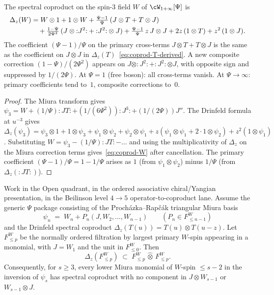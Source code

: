 \begin{proposition}
\label{prop:spin3-miura-coprod}
\ClaimStatusProvedHere
The spectral coproduct on the spin-$3$ field $W$ of
$\cW_{1+\infty}[\Psi]$ is
\begin{align}
\label{eq:coprod-W}
 \Delta_z(W)
 &= W \otimes 1 + 1 \otimes W
 + \tfrac{\Psi - 1}{\Psi}\,
 (J \otimes T + T \otimes J) \\
 &\quad
 + \tfrac{1 - \Psi}{2\Psi^2}\,
 (J \otimes {:}J^2{:}
 + {:}J^2{:} \otimes J)
 + \tfrac{\Psi - 1}{\Psi}\,z\,
 J \otimes J
 + 2z\,(1 \otimes T)
 + z^2\,(1 \otimes J).
 \notag
\end{align}
The coefficient $(\Psi - 1)/\Psi$ on the primary
cross-terms $J \otimes T + T \otimes J$ is the same as
the coefficient on $J \otimes J$ in
$\Delta_z(T)$~\eqref{eq:coprod-T-derived}. A new
composite correction $(1 - \Psi)/(2\Psi^2)$ appears
on $J \otimes {:}J^2{:} + {:}J^2{:} \otimes J$, with
opposite sign and suppressed by $1/(2\Psi)$.
At $\Psi = 1$ \textup{(}free boson\textup{)}: all
cross-terms vanish. At $\Psi \to \infty$: primary
coefficients tend to~$1$, composite corrections to~$0$.
\end{proposition}

\begin{proof}
The Miura transform gives
$\psi_3 = W + (1/\Psi){:}JT{:} + (1/(6\Psi^2)){:}J^3{:}
+ (1/(2\Psi))J''$. The Drinfeld formula at $u^{-3}$
gives $\Delta_z(\psi_3) = \psi_3 \otimes 1 + 1 \otimes
\psi_3 + \psi_1 \otimes \psi_2 + \psi_2 \otimes \psi_1
+ z(\psi_1 \otimes \psi_1 + 2 \cdot 1 \otimes \psi_2)
+ z^2(1 \otimes \psi_1)$. Substituting $W = \psi_3 -
(1/\Psi){:}JT{:} - \ldots$ and using the multiplicativity
of $\Delta_z$ on the Miura correction terms
gives~\eqref{eq:coprod-W} after cancellation.
The primary coefficient $(\Psi - 1)/\Psi = 1 - 1/\Psi$
arises as $1$ (from $\psi_1 \otimes \psi_2$)
minus $1/\Psi$ (from $\Delta_z({:}JT{:})$).
\end{proof}

\begin{lemma}
\label{lem:miura-triangularity-under-Delta}
\ClaimStatusProvedHere
Work in the Open quadrant, in the ordered associative
chiral/Yangian presentation, in the Beilinson level
$4 \to 5$ operator-to-coproduct lane.  Assume the generic
$\Psi$ package consisting of the
Proch\'azka--Rap\v{c}\'ak triangular Miura basis
\[
 \psi_n
 \;=\;
 W_n + P_n(J,W_2,\ldots,W_{n-1})
 \qquad (P_n \in F^{W}_{\leq n-1})
\]
and the Drinfeld spectral coproduct
$\Delta_z(T(u)) = T(u)\otimes T(u-z)$.  Let
$F^{W}_{\leq p}$ be the normally ordered filtration by
largest primary $W$-spin appearing in a monomial, with
$J=W_1$ and the unit in $F^{W}_{\leq0}$.  Then
\[
 \Delta_z(F^{W}_{\leq p})
 \;\subset\;
 F^{W}_{\leq p}\,\widehat{\otimes}\,F^{W}_{\leq p}.
\]
Consequently, for $s\geq3$, every lower Miura monomial of
$W$-spin $\leq s-2$ in the inversion of $\psi_s$ has
spectral coproduct with no component in
$J\otimes W_{s-1}$ or $W_{s-1}\otimes J$.
\end{lemma}

